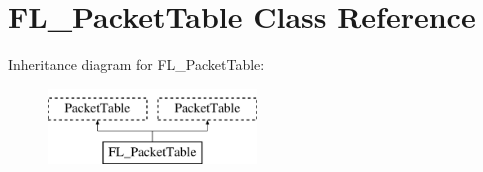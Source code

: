 \hypertarget{class_f_l___packet_table}{}\section{F\+L\+\_\+\+Packet\+Table Class Reference}
\label{class_f_l___packet_table}
Inheritance diagram for F\+L\+\_\+\+Packet\+Table\+:\begin{figure}[H]
\begin{center}
\leavevmode
\includegraphics[height=2.000000cm]{class_f_l___packet_table}
\end{center}
\end{figure}

